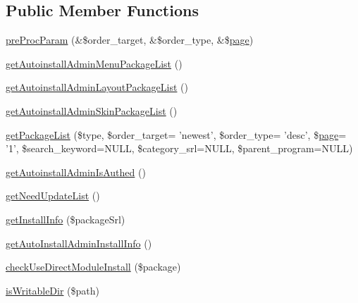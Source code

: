 \subsection*{Public Member Functions}
\begin{DoxyCompactItemize}
\item 
\hyperlink{classautoinstallAdminModel_a614c3051b3e9abff8c17dfc0664d6da5}{pre\-Proc\-Param} (\&\$order\-\_\-target, \&\$order\-\_\-type, \&\$\hyperlink{classpage}{page})
\item 
\hyperlink{classautoinstallAdminModel_a9cb4da298ab863dec8b7664cac2e42a5}{get\-Autoinstall\-Admin\-Menu\-Package\-List} ()
\item 
\hyperlink{classautoinstallAdminModel_a3892c760f1b77e23fdb38a9784cf0ec2}{get\-Autoinstall\-Admin\-Layout\-Package\-List} ()
\item 
\hyperlink{classautoinstallAdminModel_aee0002dcda8a05d57f8f7e5304be087c}{get\-Autoinstall\-Admin\-Skin\-Package\-List} ()
\item 
\hyperlink{classautoinstallAdminModel_a908daae5c3fb3b9c1c58f6ecf9dcd78f}{get\-Package\-List} (\$type, \$order\-\_\-target= 'newest', \$order\-\_\-type= 'desc', \$\hyperlink{classpage}{page}= '1', \$search\-\_\-keyword=N\-U\-L\-L, \$category\-\_\-srl=N\-U\-L\-L, \$parent\-\_\-program=N\-U\-L\-L)
\item 
\hyperlink{classautoinstallAdminModel_ac0b475b5969fded7a56103ba2e1fa710}{get\-Autoinstall\-Admin\-Is\-Authed} ()
\item 
\hyperlink{classautoinstallAdminModel_a6bba9a390c1274bc3c39a39310781b01}{get\-Need\-Update\-List} ()
\item 
\hyperlink{classautoinstallAdminModel_a8824834dd97b7e69b74af51778d27ed6}{get\-Install\-Info} (\$package\-Srl)
\item 
\hyperlink{classautoinstallAdminModel_ad6d50fbb755d2b48cdbd4269a1d1e404}{get\-Auto\-Install\-Admin\-Install\-Info} ()
\item 
\hyperlink{classautoinstallAdminModel_a899c3f3182e6c80b28f0aabc261bf38c}{check\-Use\-Direct\-Module\-Install} (\$package)
\item 
\hyperlink{classautoinstallAdminModel_ab3314bacf64ba16ea88180124699fc54}{is\-Writable\-Dir} (\$path)
\end{DoxyCompactItemize}
